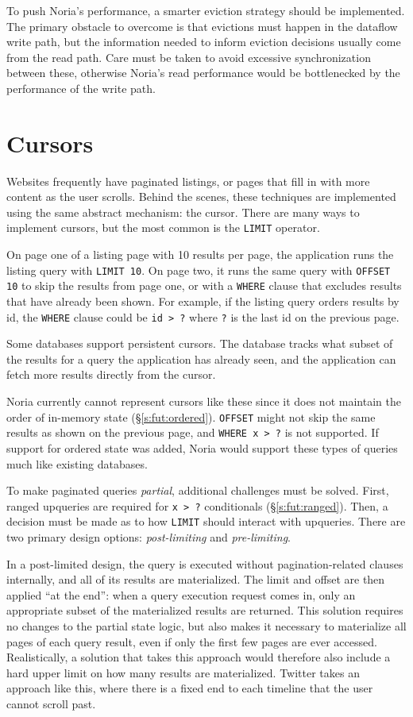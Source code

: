 To push Noria's performance, a smarter eviction strategy should be implemented.
The primary obstacle to overcome is that evictions must happen in the dataflow
write path, but the information needed to inform eviction decisions usually come
from the read path. Care must be taken to avoid excessive synchronization
between these, otherwise Noria's read performance would be bottlenecked by the
performance of the write path.

\section{Cursors}
\label{s:fut:cursors}

Websites frequently have paginated listings, or pages that fill in with more
content as the user scrolls. Behind the scenes, these techniques are implemented
using the same abstract mechanism: the cursor. There are many ways to implement
cursors, but the most common is the \texttt{LIMIT} operator.

On page one of a listing page with 10 results per page, the application runs the
listing query with \texttt{LIMIT 10}. On page two, it runs the same query with
\texttt{OFFSET 10} to skip the results from page one, or with a \texttt{WHERE}
clause that excludes results that have already been shown. For example, if the
listing query orders results by id, the \texttt{WHERE} clause could be
\texttt{id > ?} where \texttt{?} is the last id on the previous page.

Some databases support persistent cursors. The database tracks what subset of
the results for a query the application has already seen, and the application
can fetch more results directly from the cursor.

Noria currently cannot represent cursors like these since it does not maintain
the order of in-memory state (\S\ref{s:fut:ordered}). \texttt{OFFSET} might not
skip the same results as shown on the previous page, and \texttt{WHERE x > ?} is
not supported. If support for ordered state was added, Noria would support these
types of queries much like existing databases.

To make paginated queries \emph{partial}, additional challenges must be solved.
First, ranged upqueries are required for \texttt{x > ?} conditionals
(\S\ref{s:fut:ranged}). Then, a decision must be made as to how \texttt{LIMIT}
should interact with upqueries. There are two primary design options:
\emph{post-limiting} and \emph{pre-limiting}.

In a post-limited design, the query is executed without pagination-related
clauses internally, and all of its results are materialized. The limit and
offset are then applied ``at the end'': when a query execution request comes in,
only an appropriate subset of the materialized results are returned. This
solution requires no changes to the partial state logic, but also makes it
necessary to materialize all pages of each query result, even if only the first
few pages are ever accessed. Realistically, a solution that takes this approach
would therefore also include a hard upper limit on how many results are
materialized. Twitter takes an approach like this, where there is a fixed end to
each timeline that the user cannot scroll past.

